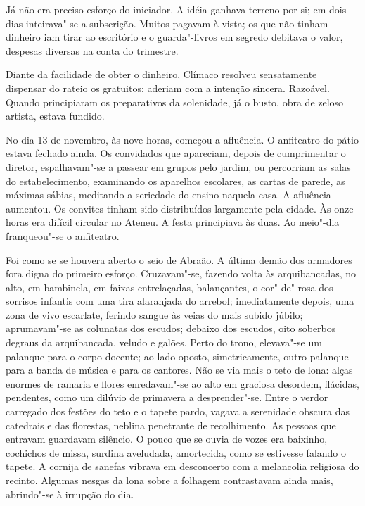 Já não era preciso esforço do
iniciador. A idéia ganhava terreno por si; em dois dias inteirava"-se
a subscrição. Muitos pagavam à vista; os que não tinham dinheiro iam
tirar ao escritório e o guarda"-livros em segredo debitava o valor,
despesas diversas na conta do trimestre. 

Diante da facilidade de obter
o dinheiro, Clímaco resolveu sensatamente dispensar do rateio os
gratuitos: aderiam com a intenção sincera. Razoável. Quando
principiaram os preparativos da solenidade, já o busto, obra de zeloso
artista, estava fundido. 

No dia 13 de novembro, às nove horas, começou
a afluência. O anfiteatro do pátio estava fechado ainda. Os convidados
que apareciam, depois de cumprimentar o diretor, espalhavam"-se a
passear em grupos pelo jardim, ou percorriam as salas do
estabelecimento, examinando os aparelhos escolares, as cartas de
parede, as máximas sábias, meditando a seriedade do ensino naquela
casa. A afluência aumentou. Os convites tinham sido distribuídos
largamente pela cidade. Às onze horas era difícil circular no Ateneu. 
A festa principiava às duas. Ao meio"-dia franqueou"-se o anfiteatro.

Foi como se se houvera aberto o seio de Abraão. A última demão dos
armadores fora digna do primeiro esforço. Cruzavam"-se, fazendo volta
às arquibancadas, no alto, em bambinela, em faixas entrelaçadas,
balançantes, o cor"-de"-rosa dos sorrisos infantis com uma tira
alaranjada do arrebol; imediatamente depois, uma zona de vivo
escarlate, ferindo sangue às veias do mais subido júbilo;
aprumavam"-se as colunatas dos escudos; debaixo dos escudos, oito
soberbos degraus da arquibancada, veludo e galões. Perto do trono,
elevava"-se um palanque para o corpo docente; ao lado oposto,
simetricamente, outro palanque para a banda de música e para os
cantores. Não se via mais o teto de lona: alças enormes de ramaria e
flores enredavam"-se ao alto em graciosa desordem, flácidas,
pendentes, como um dilúvio de primavera a desprender"-se. Entre o
verdor carregado dos festões do teto e o tapete pardo, vagava a
serenidade obscura das catedrais e das florestas, neblina penetrante de
recolhimento. As pessoas que entravam guardavam silêncio. O pouco que
se ouvia de vozes era baixinho, cochichos de missa, surdina aveludada,
amortecida, como se estivesse falando o tapete. A cornija de sanefas
vibrava em desconcerto com a melancolia religiosa do recinto. Algumas
nesgas da lona sobre a folhagem contrastavam ainda mais, abrindo"-se à
irrupção do dia. 

